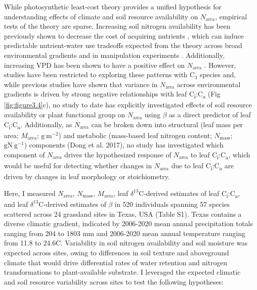 While photosynthetic least-cost theory provides a unified hypothesis for understanding effects of climate and soil resource availability on $N_\mathrm{area}$, empirical tests of the theory are sparse. Increasing soil nitrogen availability has been previously shown to decrease the cost of acquiring nutrients , which can induce predictable nutrient-water use tradeoffs expected from the theory across broad environmental gradients  and in manipulation experiments . Additionally, increasing VPD has been shown to have a positive effect on $N_\mathrm{area}$ . However, studies have been restricted to exploring these patterns with C$_3$ species and, while previous studies have shown that variance in $N_\mathrm{area}$ across environmental gradients is driven by strong negative relationships with leaf C\textsubscript{i}:C\textsubscript{a} (Fig \ref{fig:figure3.4}c), no study to date has explicitly investigated effects of soil resource availability or plant functional group on $N_\mathrm{area}$ using $\beta$ as a direct predictor of leaf C\textsubscript{i}:C\textsubscript{a}. Additionally, as $N_\mathrm{area}$ can be broken down into structural (leaf mass per area; $M_\mathrm{area}$; $\mathrm{g\ m^{-2}}$) and metabolic (mass-based leaf nitrogen content; $N_\mathrm{mass}$; $\mathrm{g N\ g^{-1}}$) components (Dong et al. 2017), no study has investigated which component of $N_\mathrm{area}$ drives the hypothesized response of $N_\mathrm{area}$ to leaf C\textsubscript{i}:C\textsubscript{a}, which would be useful for detecting whether changes in $N_\mathrm{area}$ due to leaf C\textsubscript{i}:C\textsubscript{a} are driven by changes in leaf morphology or stoichiometry.

Here, I measured $N_\mathrm{area}$, $N_\mathrm{mass}$, $M_\mathrm{area}$, leaf $\delta^{13}$C-derived estimates of leaf C\textsubscript{i}:C\textsubscript{a}, and leaf $\delta^{13}$C-derived estimates of $\beta$ in 520 individuals spanning 57 species scattered across 24 grassland sites in Texas, USA (Table S1). Texas contains a diverse climatic gradient, indicated by 2006-2020 mean annual precipitation totals ranging from 204 to 1803 mm and 2006-2020 mean annual temperature ranging from 11.8\textdegree{} to 24.6\textdegree{}C. Variability in soil nitrogen availability and soil moisture was expected across sites, owing to differences in soil texture and aboveground climate that would drive differential rates of water retention and nitrogen transformations to plant-available substrate. I leveraged the expected climatic and soil resource variability across sites to test the following hypotheses:

